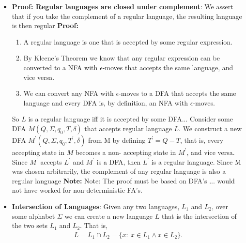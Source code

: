 \documentclass{report}
\begin{document}
\begin{itemize}
        \item \textbf{Proof: Regular languages are closed under complement}: We assert that if you take the complement of a regular language, the resulting language is then regular
            \bigbreak \noindent 
            \textbf{Proof:}
            \begin{enumerate}
                \item A regular language is one that is accepted by some regular expression.
               \item By Kleene’s Theorem we know that any regular expression can be converted to a NFA with $\epsilon$-moves that accepts the same language, and vice versa.
                \item  We can convert any NFA with $\epsilon$-moves to a DFA that accepts the same language and every DFA is, by definition, an NFA with $\epsilon$-moves. 
            \end{enumerate}
            So $L$ is a regular language iff it is accepted by some DFA...
            \bigbreak \noindent 
            Consider some DFA $M(Q, \Sigma, q_{0}, T, \delta)$ that accepts regular language $L$.
            \bigbreak \noindent 
            We construct a new DFA $M^{\prime}(Q, \Sigma, q_{0}, T^{\prime}, \delta)$ from M by defining $T^{\prime} = Q - T$, that is, every accepting state in $M$ becomes a non- accepting state in $M^{\prime}$, and vice versa.
            \bigbreak \noindent 
            Since $M^{\prime}$ accepts $L^{\prime}$ and $M^{\prime}$ is a DFA, then $L^{\prime}$ is a regular language.
            \bigbreak \noindent 
            Since M was chosen arbitrarily, the complement of any regular language is also a regular language
            \bigbreak \noindent 
            \blacksquare
            \bigbreak \noindent 
            \textbf{Note:} Note: The proof must be based on DFA’s ... would not have worked for non-deterministic FA’s.
        \item \textbf{Intersection of Languages}:
            Given any two languages, $L_{1}$ and $L_{2}$, over some alphabet $\Sigma$ we can create a new language $L$ that is the intersection of the two sets $L_{1}$ and $L_{2}$.
            \bigbreak \noindent 
            That is, 
            \begin{align*}
                L = L_{1} \cap L_{2} = \{x:\ x \in L_{1} \land x\in L_{2} \}
            .\end{align*}

\end{itemize}
\end{document}
